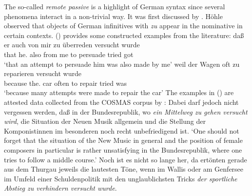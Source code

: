 The so-called \emph{remote passive} is a highlight of German syntax since several
phenomena interact in a non-trivial way. It was first discussed by \citet[--176]{Hoehle78a}. Höhle observed that objects of German infinitives with \emph{zu} appear in the
nominative in certain contexts. () provides some constructed examples from the literature:
\eal
\ex{}
\gll daß  er        auch von  mir zu überreden versucht wurde\footnotemark\\
     that he.\NOM{} also from me  to persuade  tried    got\\\german
{}
\glt `that an attempt to persuade him was also made by me'
\ex 
\gll weil    der        Wagen oft   zu reparieren versucht wurde\\
     because the.\NOM{} car   often to repair     tried    was\\
\glt `because many attempts were made to repair the car'\label{bsp-zu-reparieren-versucht-wurde}
\zl
The examples in () are attested data collected from the COSMAS corpus by \citet[--137]{Mueller2002b}:
\eal
\ex Dabei darf jedoch nicht vergessen werden, daß in der Bundesrepublik, wo \emph{ein Mittelweg zu gehen versucht wird}, 
die Situation der Neuen Musik allgemein und die Stellung der Komponistinnen im besonderen noch recht unbefriedigend ist.\footnotemark
%
\glt `One should not forget that the situation of the New Music in general and the position of female composers 
in particular is rather unsatisfying in the Bundesrepublik, where one tries to follow a middle course.'
\ex Noch ist es nicht so lange her, da ertönten gerade aus dem Thurgau jeweils die lautesten Töne, 
    wenn im Wallis oder am Genfersee im Umfeld einer Schuldenpolitik mit den unglaublichsten Tricks 
    \emph{der sportliche Abstieg zu verhindern versucht wurde}.\footnotemark
%
